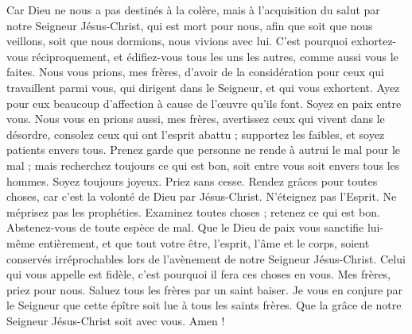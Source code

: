 \begin{multicols}{2}
Car Dieu ne nous a pas destinés à la colère, mais à l'acquisition du salut par notre Seigneur Jésus-Christ,
qui est mort pour nous, afin que soit que nous veillons, soit que nous dormions, nous vivions avec lui.
C'est pourquoi exhortez-vous réciproquement, et édifiez-vous tous les uns les autres, comme aussi vous le faites.
Nous vous prions, mes frères, d’avoir de la considération pour ceux qui travaillent parmi vous, qui dirigent dans le Seigneur, et qui vous exhortent.
Ayez pour eux beaucoup d’affection à cause de l’œuvre qu'ils font. Soyez en paix entre vous.
Nous vous en prions aussi, mes frères, avertissez ceux qui vivent dans le désordre, consolez ceux qui ont l'esprit abattu ; supportez les faibles, et soyez patients envers tous.
Prenez garde que personne ne rende à autrui le mal pour le mal ; mais recherchez toujours ce qui est bon, soit entre vous soit envers tous les hommes.
Soyez toujours joyeux.
Priez sans cesse.
Rendez grâces pour toutes choses, car c'est la volonté de Dieu par Jésus-Christ.
N'éteignez pas l'Esprit.
Ne méprisez pas les prophéties.
Examinez toutes choses ; retenez ce qui est bon.
Abstenez-vous de toute espèce de mal.
Que le Dieu de paix vous sanctifie lui-même entièrement, et que tout votre être, l’esprit, l'âme et le corps, soient conservés irréprochables lors de l’avènement de notre Seigneur Jésus-Christ.
Celui qui vous appelle est fidèle, c'est pourquoi il fera ces choses en vous.
Mes frères, priez pour nous.
Saluez tous les frères par un saint baiser.
Je vous en conjure par le Seigneur que cette épître soit lue à tous les saints frères.
Que la grâce de notre Seigneur Jésus-Christ soit avec vous. Amen !
\PPE{}
\end{multicols}
